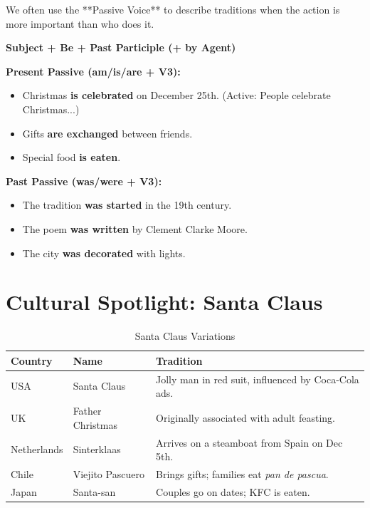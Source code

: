 We often use the **Passive Voice** to describe traditions when the action is more important than who does it.

\begin{grammarbox}[title=Structure]
\textbf{Subject + Be + Past Participle (+ by Agent)}
\end{grammarbox}

\begin{grammarbox}[title=Examples]
\textbf{Present Passive (am/is/are + V3):}
\begin{itemize}
    \item Christmas \textbf{is celebrated} on December 25th. (Active: People celebrate Christmas...)
    \item Gifts \textbf{are exchanged} between friends.
    \item Special food \textbf{is eaten}.
\end{itemize}

\textbf{Past Passive (was/were + V3):}
\begin{itemize}
    \item The tradition \textbf{was started} in the 19th century.
    \item The poem \textbf{was written} by Clement Clarke Moore.
    \item The city \textbf{was decorated} with lights.
\end{itemize}
\end{grammarbox}

\section{Cultural Spotlight: Santa Claus}

\begin{table}[h]
\centering
\begin{tabular}{|l|l|p{6cm}|}
\hline
\textbf{Country} & \textbf{Name} & \textbf{Tradition} \\
\hline
USA & Santa Claus & Jolly man in red suit, influenced by Coca-Cola ads. \\
\hline
UK & Father Christmas & Originally associated with adult feasting. \\
\hline
Netherlands & Sinterklaas & Arrives on a steamboat from Spain on Dec 5th. \\
\hline
Chile & Viejito Pascuero & Brings gifts; families eat \textit{pan de pascua}. \\
\hline
Japan & Santa-san & Couples go on dates; KFC is eaten. \\
\hline
\end{tabular}
\caption{Santa Claus Variations}
\end{table}

